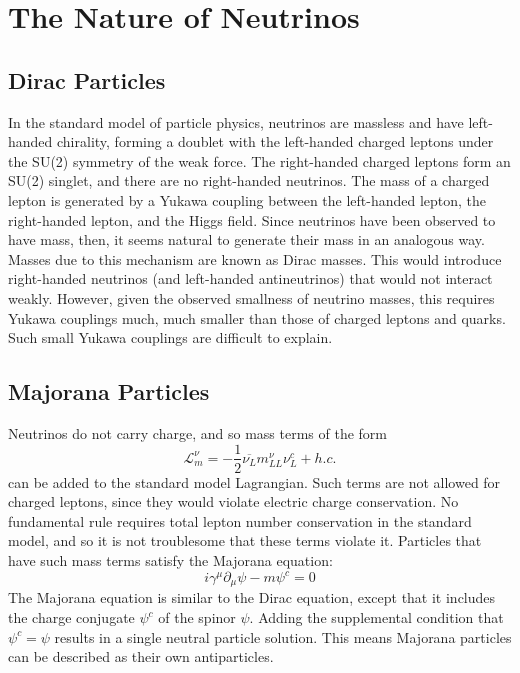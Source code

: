 \documentclass[herrin-thesis.tex]{subfiles}
\begin{document}
\section{The Nature of Neutrinos}
\subsection{Dirac Particles}
In the standard model of particle physics, neutrinos are massless and have left-handed chirality, forming a doublet with the left-handed charged leptons under the SU(2) symmetry of the weak force. The right-handed charged leptons form an SU(2) singlet, and there are no right-handed neutrinos. The mass of a charged lepton is generated by a Yukawa coupling between the left-handed lepton, the right-handed lepton, and the Higgs field. Since neutrinos have been observed to have mass, then, it seems natural to generate their mass in an analogous way. Masses due to this mechanism are known as Dirac masses. This would introduce right-handed neutrinos (and left-handed antineutrinos) that would not interact weakly. However, given the observed smallness of neutrino masses, this requires Yukawa couplings much, much smaller than those of charged leptons and quarks. Such small Yukawa couplings are difficult to explain.

\subsection{Majorana Particles}
Neutrinos do not carry charge, and so mass terms of the form
\begin{equation}
\mathcal{L}_{m}^{\nu} = -\frac{1}{2}\overline{\nu_{L}} m_{L L}^{\nu} \nu_{L}^{c} +h.c.
\label{eq:nu_majorana_lagrangian}
\end{equation}
can be added to the standard model Lagrangian. Such terms are not allowed for charged leptons, since they would violate electric charge conservation. No fundamental rule requires total lepton number conservation in the standard model, and so it is not troublesome that these terms violate it. Particles that have such mass terms satisfy the Majorana equation:
\begin{equation}
i\gamma^{\mu}\partial_{\mu}\psi - m \psi^{c} = 0
\end{equation}
The Majorana equation is similar to the Dirac equation, except that it includes the charge conjugate \(\psi^c\) of the spinor \(\psi\). Adding the supplemental condition that \(\psi^c = \psi\) results in a single neutral particle solution. This means Majorana particles can be described as their own antiparticles.
\end{document}
